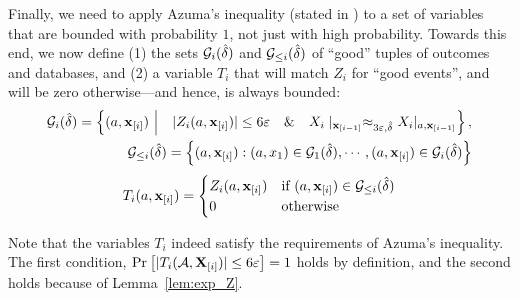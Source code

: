 Finally, we need to apply Azuma's inequality (stated in ) to a set of variables that are bounded with probability $1$, not just with high probability. Towards this end, we now define (1) the sets $\mathcal{G}_i(\hat\delta)$ and $\mathcal{G}_{\leq i}(\hat\delta)$ of ``good'' tuples of outcomes and databases, and (2) a variable $T_i$ that will match $Z_i$ for ``good events'', and will be zero otherwise---and hence, is always bounded:
\begin{align}
\mathcal{G}_i(\hat\delta) = \left\{(a,\mathbf{x}_{[i]}) \,\,\Big|\quad  | Z_i(a,\mathbf{x}_{[i]}) | \leq 6 \varepsilon \quad \& \quad X_i\mid_{\mathbf{x}_{[i-1]}} \approx_{3\varepsilon,\hat{\delta}} X_i|_{a, \mathbf{x}_{[i-1]}}   \right\},
\label{eq:G}\\
\mathcal{G}_{\leq i}(\hat\delta)   = \left\{(a,\mathbf{x}_{[i]}) : (a,x_1) \in \mathcal{G}_1(\hat\delta), \cdots, (a,\mathbf{x}_{[i]}) \in \mathcal{G}_i(\hat\delta) \right\} \label{eq:Gvect}
\end{align}
\begin{equation}
T_i(a,\mathbf{x}_{[i]}) = \begin{cases}
             Z_i(a,\mathbf{x}_{[i]})  & \text{if }   
             (a,\mathbf{x}_{[i]}) \in \mathcal{G}_{\leq i}(\hat\delta) \\
             0  & \text{otherwise }
       \end{cases}
\label{eq:Ti}
\end{equation}

Note that the variables $T_i$ indeed satisfy the requirements of Azuma's inequality. The first condition, $\operatorname*{\mathrm{Pr}}_{}\left[\vert T_i(\mathcal{A},\mathbf{X}_{[i]})\rvert \leq 6 \varepsilon\right] = 1$ holds by definition, and the second holds because of Lemma~\ref{lem:exp_Z}.

